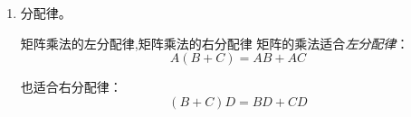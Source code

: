 \begin{enumerate}
	即，从 $AB = 0$ 不同推出 $A = 0$ 或 $B = 0$。见下例：
	$$
	\begin{bmatrix} 0 & 0 \\ 0 & 1 \end{bmatrix}
	\begin{bmatrix} 0 & 1 \\ 0 & 0 \end{bmatrix}
	=
	\begin{bmatrix} 0 & 0 \\ 0 & 0 \end{bmatrix}
	$$

	不过，我们可以提出以下概念。

	\begin{definition}{左零因子}
		对于矩阵 $A$，如果存在一个矩阵 $B \ne 0$ 使得 $AB = 0$，那么称 $A$ 是一个\emph{左零因子}。
	\end{definition}

	\begin{definition}{右零因子}
		对于矩阵 $A$，如果存在一个矩阵 $C \ne 0$ 使得 $CA = 0$，那么称 $A$ 是一个\emph{右零因子}。
	\end{definition}

	\begin{definition}{零因子}
		左零因子和右零因子统称为\emph{零因子}。
	\end{definition}

	\begin{definition}{平凡的零因子}
		显然，零矩阵是零因子，称它为\emph{平凡的零因子}。
	\end{definition}

	\item 分配律。

	\begin{theorem}{矩阵乘法的左分配律,矩阵乘法的右分配律}
		矩阵的乘法适合\emph{左分配律}：
		$$
		A (B + C) = AB + AC
		$$

		也适合右分配律：
		$$
		(B + C) D = BD + CD
		$$
	\end{theorem}



\end{enumerate}